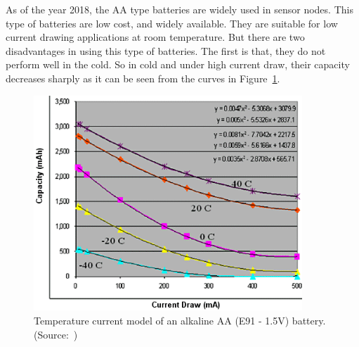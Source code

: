 \documentclass[12pt, oneandhalf, chaparabic, sees, ms]{metu}
\begin{document}
As of the year 2018, the AA type batteries are widely used in sensor nodes. 
This type of batteries are low cost, and widely available.
They are suitable for low current drawing applications at room temperature. But there are two disadvantages in using this type of batteries. 
The first is that, they do not perform well in the cold. So in cold and under high current draw, their capacity decreases sharply as it can be seen from the curves in
Figure~\ref{fig:e91}.
% 
%
%
\vspace{2cm}
\begin{figure}[!htbp]
\begin{center}
  \includegraphics[width=0.90\textwidth]{e91.png}
   \end{center}
  \caption{Temperature current model of an alkaline AA (E91 - 1.5V) battery. (Source:~\protect\cite{young2008})}
 \label{fig:e91}
\end{figure}
% 
%
%

\newpage
\end{document}
